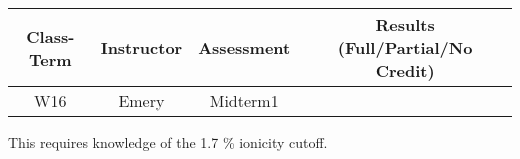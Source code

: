 \begin{outcomes}
	\begin{center}
		\begin{tabular}{cccc}
			\hline\hline
                Class-Term & Instructor & Assessment & Results (Full/Partial/No Credit) \\
		\hline
                W16 & Emery & Midterm1 &  \\
			\hline
		\end{tabular}
	\end{center}
\end{outcomes}

\begin{comments}

This requires knowledge of the 1.7 \% ionicity cutoff.

\end{comments}